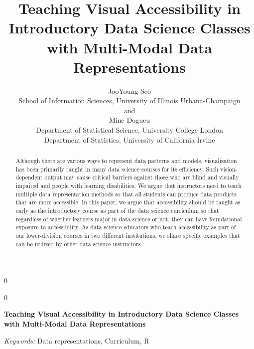 \documentclass[12pt]{article}
\newcommand{\blind}{0}
\begin{document}
\def\spacingset#1{\renewcommand{\baselinestretch}%
{#1}\small\normalsize} \spacingset{1}



\blind
{
  \title{\bf Teaching Visual Accessibility in Introductory Data Science Classes with Multi-Modal Data Representations}

  \author{
        JooYoung Seo \\
    School of Information Sciences, University of Illinois Urbana-Champaign\\
     and \\     Mine Dogucu \\
    Department of Statistical Science, University College London\\
Department of Statistics, University of California Irvine\\
      }
  \maketitle
} \fi

\blind
{
  \bigskip
  \bigskip
  \bigskip
  \begin{center}
    {\LARGE\bf Teaching Visual Accessibility in Introductory Data Science Classes with Multi-Modal Data Representations}
  \end{center}
  \medskip
} \fi

\bigskip
\begin{abstract}
Although there are various ways to represent data patterns and models, visualization has been primarily taught in many data science courses for its efficiency. Such vision-dependent output may cause critical barriers against those who are blind and visually impaired and people with learning disabilities. We argue that instructors need to teach multiple data representation methods so that all students can produce data products that are more accessible. In this paper, we argue that accessibility should be taught as early as the introductory course as part of the data science curriculum so that regardless of whether learners major in data science or not, they can have foundational exposure to accessibility. As data science educators who teach accessibility as part of our lower-division courses in two different institutions, we share specific examples that can be utilized by other data science instructors.
\end{abstract}

\noindent%
{\it Keywords:} Data representations, Curriculum, R
\vfill
\end{document}
